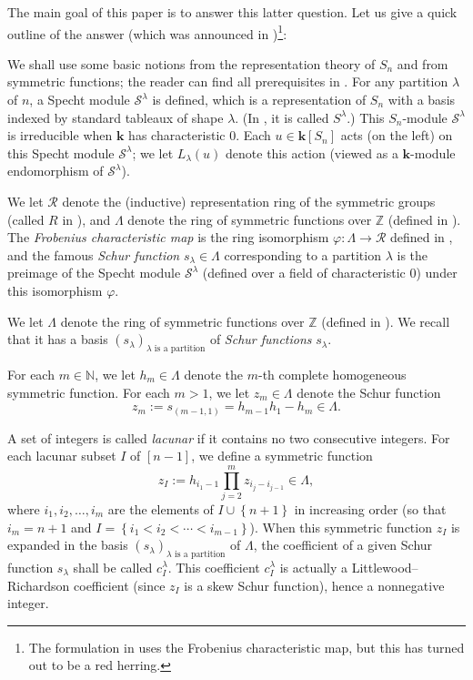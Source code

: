 \documentclass[numbers=enddot,12pt,final,onecolumn,notitlepage]{scrartcl}%
\theoremstyle{definition}
\newenvironment{noncompile}{}{}
\let\prodnonlimits\prod
\renewcommand{\prod}{\prodnonlimits\limits}
\begin{document}
The main goal of this paper is to answer this latter question. Let us give a
quick outline of the answer (which was announced in \cite[\S 11]%
{fps2024sn})\footnote{The formulation in \cite[\S 11]{fps2024sn} uses the
Frobenius characteristic map, but this has turned out to be a red herring.}:

We shall use some basic notions from the representation theory of $S_{n}$ and
from symmetric functions; the reader can find all prerequisites in
\cite[Chapters 6 and 7]{Fulton97}. For any partition $\lambda$ of $n$, a
Specht module $\mathcal{S}^{\lambda}$ is defined, which is a representation of
$S_{n}$ with a basis indexed by standard tableaux of shape $\lambda$. (In
\cite{Fulton97}, it is called $S^{\lambda}$.) This $S_{n}$-module
$\mathcal{S}^{\lambda}$ is irreducible when $\mathbf{k}$ has characteristic
$0$. Each $u\in\mathbf{k}\left[  S_{n}\right]  $ acts (on the left) on this
Specht module $\mathcal{S}^{\lambda}$; we let $L_{\lambda}\left(  u\right)  $
denote this action (viewed as a $\mathbf{k}$-module endomorphism of
$\mathcal{S}^{\lambda}$).

\begin{noncompile}
We let $\mathcal{R}$ denote the (inductive) representation ring of the
symmetric groups (called $R$ in \cite[\S 7.3]{Fulton97}), and $\Lambda$ denote
the ring of symmetric functions over $\mathbb{Z}$ (defined in \cite[\S 6.2]%
{Fulton97}). The \emph{Frobenius characteristic map} is the ring isomorphism
$\varphi:\Lambda\rightarrow\mathcal{R}$ defined in \cite[\S 7.3]{Fulton97},
and the famous \emph{Schur function} $s_{\lambda}\in\Lambda$ corresponding to
a partition $\lambda$ is the preimage of the Specht module $\mathcal{S}%
^{\lambda}$ (defined over a field of characteristic $0$) under this
isomorphism $\varphi$.
\end{noncompile}

We let $\Lambda$ denote the ring of symmetric functions over $\mathbb{Z}$
(defined in \cite[\S 6.2]{Fulton97}). We recall that it has a basis $\left(
s_{\lambda}\right)  _{\lambda\text{ is a partition}}$ of \emph{Schur
functions} $s_{\lambda}$.

For each $m\in\mathbb{N}$, we let $h_{m}\in\Lambda$ denote the $m$-th complete
homogeneous symmetric function. For each $m>1$, we let $z_{m}\in\Lambda$
denote the Schur function
\[
z_{m}:=s_{\left(  m-1,1\right)  }=h_{m-1}h_{1}-h_{m}\in\Lambda.
\]


A set of integers is called \emph{lacunar} if it contains no two consecutive
integers. For each lacunar subset $I$ of $\left[  n-1\right]  $, we define a
symmetric function%
\[
z_{I}:=h_{i_{1}-1}\prod_{j=2}^{m}z_{i_{j}-i_{j-1}}\in\Lambda,
\]
where $i_{1},i_{2},\ldots,i_{m}$ are the elements of $I\cup\left\{
n+1\right\}  $ in increasing order (so that $i_{m}=n+1$ and $I=\left\{
i_{1}<i_{2}<\cdots<i_{m-1}\right\}  $). When this symmetric function $z_{I}$
is expanded in the basis $\left(  s_{\lambda}\right)  _{\lambda\text{ is a
partition}}$ of $\Lambda$, the coefficient of a given Schur function
$s_{\lambda}$ shall be called $c_{I}^{\lambda}$. This coefficient
$c_{I}^{\lambda}$ is actually a Littlewood--Richardson coefficient (since
$z_{I}$ is a skew Schur function), hence a nonnegative integer.
\end{document}
